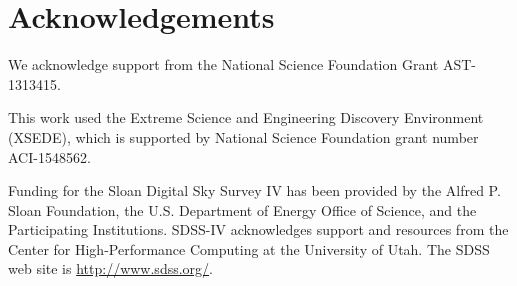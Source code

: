 \documentclass[fleqn,usenatbib]{mnras}
\begin{document}
\section*{Acknowledgements}

We acknowledge support from the National Science Foundation Grant AST-1313415.

This work used the Extreme Science and Engineering Discovery Environment (XSEDE), which is supported by National Science Foundation grant number ACI-1548562.

Funding for the Sloan Digital Sky Survey IV has been provided by
the Alfred P. Sloan Foundation, the U.S. Department of Energy Office of
Science, and the Participating Institutions. SDSS-IV acknowledges
support and resources from the Center for High-Performance Computing at
the University of Utah. The SDSS web site is \url{http://www.sdss.org/}.




\bsp	%
\label{lastpage}
\end{document}
